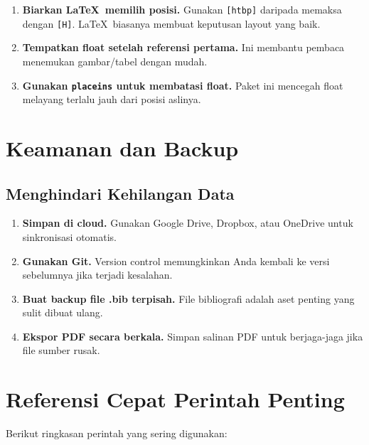 \begin{enumerate}
  \item \textbf{Biarkan \LaTeX\ memilih posisi.} Gunakan \verb|[htbp]| daripada memaksa dengan \verb|[H]|. \LaTeX\ biasanya membuat keputusan layout yang baik.

  \item \textbf{Tempatkan float setelah referensi pertama.} Ini membantu pembaca menemukan gambar/tabel dengan mudah.

  \item \textbf{Gunakan \texttt{placeins} untuk membatasi float.} Paket ini mencegah float melayang terlalu jauh dari posisi aslinya.
\end{enumerate}

\section{Keamanan dan Backup}

\subsection{Menghindari Kehilangan Data}

\begin{enumerate}
  \item \textbf{Simpan di cloud.} Gunakan Google Drive, Dropbox, atau OneDrive untuk sinkronisasi otomatis.

  \item \textbf{Gunakan Git.} Version control memungkinkan Anda kembali ke versi sebelumnya jika terjadi kesalahan.

  \item \textbf{Buat backup file .bib terpisah.} File bibliografi adalah aset penting yang sulit dibuat ulang.

  \item \textbf{Ekspor PDF secara berkala.} Simpan salinan PDF untuk berjaga-jaga jika file sumber rusak.
\end{enumerate}

\section{Referensi Cepat Perintah Penting}

Berikut ringkasan perintah yang sering digunakan:

